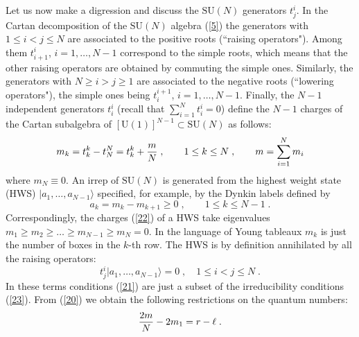 \documentclass[a4paper,12pt]{article}
\begin{document}
Let us now make a digression and discuss the $\mbox{SU}(N)$ 
generators $t^i_j$. In the Cartan decomposition of the 
$\mbox{SU}(N)$ algebra (\ref{5}) the generators with $1\leq i < j 
\leq N$ are associated to the positive roots (``raising 
operators"). Among them $t^i_{i+1}$, $i=1,\ldots, N-1$ correspond 
to the simple roots, which means that the other raising operators 
are obtained by commuting the simple ones. Similarly, the 
generators with $N\geq i > j \geq 1$ are associated to the 
negative roots (``lowering operators"), the simple ones being 
$t^{i+1}_i$, $i=1,\ldots, N-1$. Finally, the $N-1$ independent 
generators $t^i_i$ (recall that $\sum_{i=1}^Nt^i_i=0$) define the 
$N-1$ charges of the Cartan subalgebra of 
$[\mbox{U}(1)]^{N-1}\subset \mbox{SU}(N)$ as follows: 
\begin{equation}\label{22}
  m_k=t^k_k- t^N_N = t^k_k + {m\over N}\;, 
\qquad 1\leq k \leq N\;, \qquad m= \sum^{N}_{i=1}m_i 
\end{equation}
where $m_N \equiv 0$. An irrep of $\mbox{SU}(N)$ is generated from 
the highest weight state (HWS) $|a_1,\ldots,a_{N-1}\rangle $ 
specified, for example, by the Dynkin labels defined by 
\begin{equation}\label{24}
  a_k=m_k-m_{k+1}\geq 0\;, \qquad 1\leq k \leq N-1\;. 
\end{equation}
Correspondingly, the charges (\ref{22}) of a HWS take eigenvalues 
$m_1\geq m_2 \geq \ldots \geq m_{N-1}\geq m_N=0$. In the language 
of Young tableaux $m_k$ is just the number of boxes in the $k$-th 
row. The HWS is by definition annihilated by all the raising 
operators: 
\begin{equation}\label{23}
  t^i_j|a_1,\ldots,a_{N-1}\rangle =0\;, \quad 1\leq i < j \leq N\;.
\end{equation}
In these terms conditions (\ref{21}) are just a subset of the 
irreducibility conditions (\ref{23}). From (\ref{20}) we obtain 
the following restrictions on the quantum numbers: 
\begin{equation}\label{25}
{2m\over N} - 2m_1 =r-\ell \;.
\end{equation}
 
\end{document}
